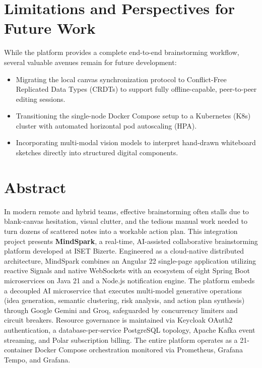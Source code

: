 \section*{Limitations and Perspectives for Future Work}
While the platform provides a complete end-to-end brainstorming workflow, several valuable avenues remain for future development:
\begin{itemize}[leftmargin=1.5em, topsep=2pt, itemsep=1.5pt, parsep=0pt]
    \item Migrating the local canvas synchronization protocol to Conflict-Free Replicated Data Types (CRDTs) to support fully offline-capable, peer-to-peer editing sessions.
    \item Transitioning the single-node Docker Compose setup to a Kubernetes (K8s) cluster with automated horizontal pod autoscaling (HPA).
    \item Incorporating multi-modal vision models to interpret hand-drawn whiteboard sketches directly into structured digital components.
\end{itemize}

\clearpage

\section*{Abstract}
\noindent In modern remote and hybrid teams, effective brainstorming often stalls due to blank-canvas hesitation, visual clutter, and the tedious manual work needed to turn dozens of scattered notes into a workable action plan. This integration project presents \textbf{MindSpark}, a real-time, AI-assisted collaborative brainstorming platform developed at ISET Bizerte. Engineered as a cloud-native distributed architecture, MindSpark combines an Angular 22 single-page application utilizing reactive Signals and native WebSockets with an ecosystem of eight Spring Boot microservices on Java 21 and a Node.js notification engine. The platform embeds a decoupled AI microservice that executes multi-model generative operations (idea generation, semantic clustering, risk analysis, and action plan synthesis) through Google Gemini and Groq, safeguarded by concurrency limiters and circuit breakers. Resource governance is maintained via Keycloak OAuth2 authentication, a database-per-service PostgreSQL topology, Apache Kafka event streaming, and Polar subscription billing. The entire platform operates as a 21-container Docker Compose orchestration monitored via Prometheus, Grafana Tempo, and Grafana.

